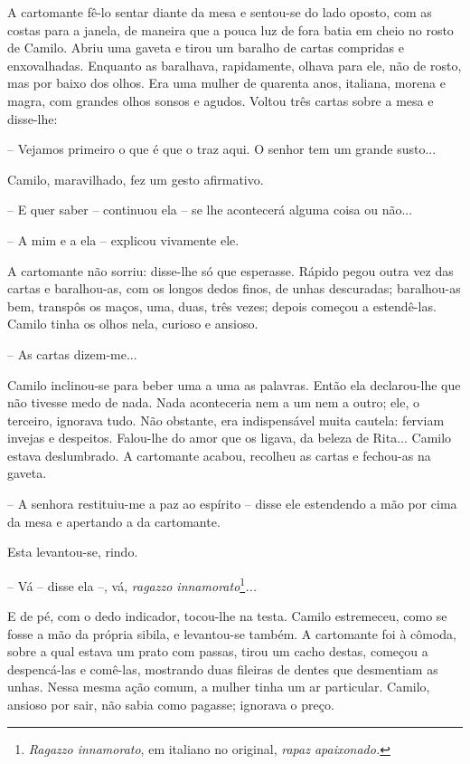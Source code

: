 A cartomante fê-lo sentar diante da mesa e sentou-se do lado oposto, com
as costas para a janela, de maneira que a pouca luz de fora batia em
cheio no rosto de Camilo. Abriu uma gaveta e tirou um baralho de cartas
compridas e enxovalhadas. Enquanto as baralhava, rapidamente, olhava
para ele, não de rosto, mas por baixo dos olhos. Era uma mulher de
quarenta anos, italiana, morena e magra, com grandes olhos sonsos e
agudos. Voltou três cartas sobre a mesa e disse-lhe:

-- Vejamos primeiro o que é que o traz aqui. O senhor tem um grande
susto...

Camilo, maravilhado, fez um gesto afirmativo.

-- E quer saber -- continuou ela -- se lhe acontecerá alguma coisa ou
não...

-- A mim e a ela -- explicou vivamente ele.

A cartomante não sorriu: disse-lhe só que esperasse. Rápido pegou outra
vez das cartas e baralhou-as, com os longos dedos finos, de unhas
descuradas; baralhou-as bem, transpôs os maços, uma, duas, três vezes;
depois começou a estendê-las. Camilo tinha os olhos nela, curioso e
ansioso.

-- As cartas dizem-me...

Camilo inclinou-se para beber uma a uma as palavras. Então ela
declarou-lhe que não tivesse medo de nada. Nada aconteceria nem a um nem
a outro; ele, o terceiro, ignorava tudo. Não obstante, era indispensável
muita cautela: ferviam invejas e despeitos. Falou-lhe do amor que os
ligava, da beleza de Rita... Camilo estava deslumbrado. A cartomante
acabou, recolheu as cartas e fechou-as na gaveta.

-- A senhora restituiu-me a paz ao espírito -- disse ele estendendo a
mão por cima da mesa e apertando a da cartomante.

Esta levantou-se, rindo.

-- Vá -- disse ela --, vá, \emph{ragazzo innamorato}\footnote{\emph{Ragazzo
  innamorato}, em italiano no original, \emph{rapaz apaixonado. }}\emph{...}

E de pé, com o dedo indicador, tocou-lhe na testa. Camilo estremeceu,
como se fosse a mão da própria sibila, e levantou-se também. A
cartomante foi à cômoda, sobre a qual estava um prato com passas, tirou
um cacho destas, começou a despencá-las e comê-las, mostrando duas
fileiras de dentes que desmentiam as unhas. Nessa mesma ação comum, a
mulher tinha um ar particular. Camilo, ansioso por sair, não sabia como
pagasse; ignorava o preço.

